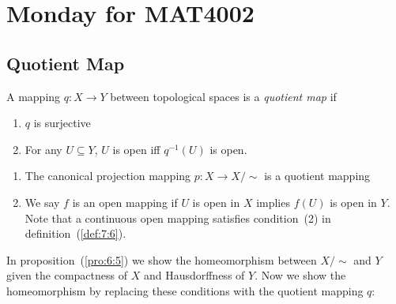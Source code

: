 \section{Monday for MAT4002}
\subsection{Quotient Map}
\begin{definition}\label{def:7:6}
A mapping $q:X\to Y$ between topological spaces is a \emph{quotient map} if 
\begin{enumerate}
\item
$q$ is surjective
\item
For any $U\subseteq Y$, $U$ is open iff $q^{-1}(U)$ is open.
\end{enumerate}
\end{definition}
\begin{remark}
\begin{enumerate}
\item
The canonical projection mapping $p:X\to X/\sim$ is a quotient mapping
\item
We say $f$ is an open mapping if $U$ is open in $X$ implies $f(U)$ is open in $Y$.
Note that a continuous open mapping satisfies condition~(2) in definition~(\ref{def:7:6}).
\end{enumerate}
\end{remark}

In proposition~(\ref{pro:6:5}) we show the homeomorphism between $X/\sim$ and $Y$ given the compactness of $X$ and Hausdorffness of $Y$.
Now we show the homeomorphism by replacing these conditions with the quotient mapping $q$:

